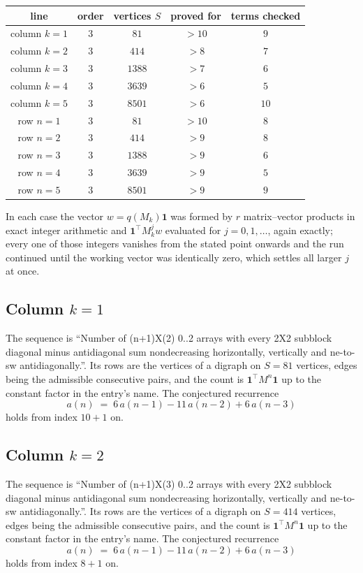\documentclass[11pt,a4paper]{article}
\theoremstyle{plain}
\theoremstyle{definition}
\begin{document}
\begin{center}
\begin{tabular}{ccccc}
line & order & vertices $S$ & proved for & terms checked \\ \hline
column $k$$=1$ & $3$ & $81$ & $>10$ & $9$ \\
column $k$$=2$ & $3$ & $414$ & $>8$ & $7$ \\
column $k$$=3$ & $3$ & $1388$ & $>7$ & $6$ \\
column $k$$=4$ & $3$ & $3639$ & $>6$ & $5$ \\
column $k$$=5$ & $3$ & $8501$ & $>6$ & $10$ \\
row $n$$=1$ & $3$ & $81$ & $>10$ & $8$ \\
row $n$$=2$ & $3$ & $414$ & $>9$ & $8$ \\
row $n$$=3$ & $3$ & $1388$ & $>9$ & $6$ \\
row $n$$=4$ & $3$ & $3639$ & $>9$ & $5$ \\
row $n$$=5$ & $3$ & $8501$ & $>9$ & $9$ \\
\end{tabular}
\end{center}

In each case the vector $w=q(M_k)\mathbf{1}$ was formed by $r$ matrix--vector products in
exact integer arithmetic and $\mathbf{1}^{\!\top}M_k^{j}w$ evaluated for $j=0,1,\dots$,
again exactly; every one of those integers vanishes from the stated point onwards and the run
continued until the working vector was identically zero, which settles all larger $j$ at once.

\subsection*{Column $k$$=1$}
The sequence is ``Number of (n+1)X(2) 0..2 arrays with every 2X2 subblock diagonal minus antidiagonal sum nondecreasing horizontally, vertically and ne-to-sw antidiagonally.''. Its rows are the vertices of a digraph on
$S=81$ vertices, edges being the admissible consecutive pairs, and the count is
$\mathbf{1}^{\!\top}M^{n}\mathbf{1}$ up to the constant factor in the entry's name.
The conjectured recurrence
\[
a(n)\;=\;6\,a(n-1) - 11\,a(n-2) + 6\,a(n-3)
\]
holds from index $10+1$ on.

\subsection*{Column $k$$=2$}
The sequence is ``Number of (n+1)X(3) 0..2 arrays with every 2X2 subblock diagonal minus antidiagonal sum nondecreasing horizontally, vertically and ne-to-sw antidiagonally.''. Its rows are the vertices of a digraph on
$S=414$ vertices, edges being the admissible consecutive pairs, and the count is
$\mathbf{1}^{\!\top}M^{n}\mathbf{1}$ up to the constant factor in the entry's name.
The conjectured recurrence
\[
a(n)\;=\;6\,a(n-1) - 11\,a(n-2) + 6\,a(n-3)
\]
holds from index $8+1$ on.
\end{document}
